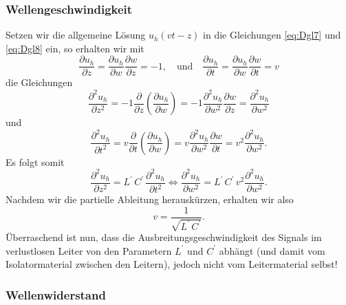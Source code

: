 \documentclass[paper=a4, parskip=half-, ngerman, fontsize=11pt]{scrreprt}
\begin{document}
\subsubsection{Wellengeschwindigkeit}

Setzen wir die allgemeine Lösung $u_{h}(v t - z)$ in die Gleichungen \eqref{eq:Dgl7} und \eqref{eq:Dgl8} ein, so
erhalten wir mit
\begin{equation*}
    \frac{\partial u_{h}}{\partial z} = \frac{\partial u_{h}}{\partial w} \frac{\partial w}{\partial z} = -1,
    \quad \text{und} \quad
    \frac{\partial u_{h}}{\partial t} = \frac{\partial u_{h}}{\partial w} \frac{\partial w}{\partial t} = v
\end{equation*}
die Gleichungen
\begin{equation*}
    \frac{\partial^{2} u_{h}}{\partial z^{2}} = -1 \frac{\partial}{\partial z} \left( \frac{\partial u_{h}}{\partial w}
    \right) = -1 \frac{\partial^{2} u_{h}}{\partial w^{2}} \frac{\partial w}{\partial z} = \frac{\partial^{2}
    u_{h}}{\partial w^{2}}
\end{equation*}
und
\begin{equation*}
    \frac{\partial^{2} u_{h}}{\partial t^{2}} = v \frac{\partial}{\partial t} \left( \frac{\partial u_{h}}{\partial w}
    \right) = v \frac{\partial^{2} u_{h}}{\partial w^{2}} \frac{\partial w}{\partial t} =v^{2} \frac{\partial^{2}
        u_{h}}{\partial w^{2}}.
\end{equation*}
Es folgt somit
\begin{equation*}
    \frac{\partial^{2} u_{h}}{\partial z^{2}} = L^{\prime} \, C^{\prime} \, \frac{\partial^{2} u_{h}}{\partial t^{2}}
    \Leftrightarrow
    \frac{\partial^{2} u_{h}}{\partial w^{2}} = L^{\prime} \, C^{\prime} \, v^{2} \frac{\partial^{2} u_{h}}{\partial
    w^{2}}.
\end{equation*}
Nachdem wir die partielle Ableitung herauskürzen, erhalten wir also
\begin{equation}
    v = \frac{1}{\sqrt{L^{\prime} \, C^{\prime}}} \label{eq:WellenGeschw1}.
\end{equation}
Überraschend ist nun, dass die Ausbreitungsgeschwindigkeit des Signals im verlustlosen Leiter von den Parametern
$L^{\prime}$ und $C^{\prime}$ abhängt (und damit vom Isolatormaterial zwischen den Leitern), jedoch nicht vom
Leitermaterial selbst!


\subsubsection{Wellenwiderstand}
\end{document}
